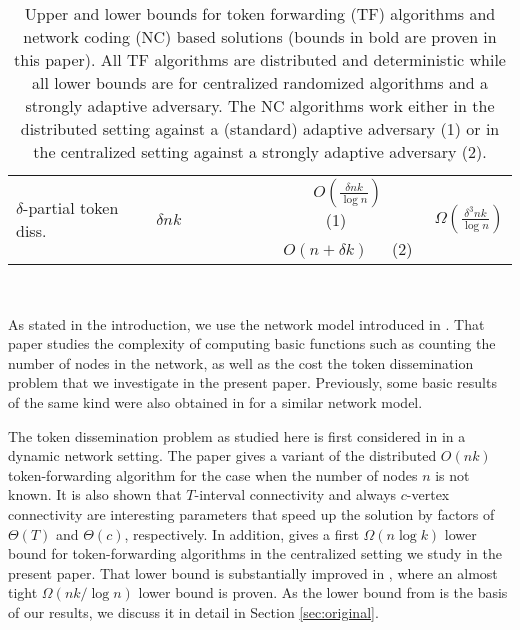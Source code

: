 \documentclass{llncs}
\begin{document}
\begin{table}[t]
\begin{tabular}{ | l || c | c | c | }
\multirow{2}{*}{$\delta$-partial token diss.} & \multirow{2}{*}{$\delta nk$} 	&\ \ \ \ \ \ \ \ \ \ 	 $O(\frac{\delta nk}{\log n})$ \ \ \ \ \ \ \ \small (1)  &  \multirow{2}{*}{ {\boldmath$\Omega(\frac{\delta^3 nk}{\log n})$} }\\ 
 & & \ \ \ \ \ \ \ \ \ \ $O(n+\delta k)$ \ \,\ \small (2) & \\ \hline
\end{tabular}\\[1mm]
\caption{Upper and lower bounds for token forwarding (TF) algorithms
    and network coding (NC) based solutions (bounds in bold are proven
    in this paper). All TF algorithms are
    distributed and deterministic while all lower bounds are for
    centralized randomized algorithms and a strongly adaptive
    adversary. The NC algorithms work either in the distributed
    setting against a (standard) adaptive adversary (1) or in the
    centralized setting against a strongly adaptive adversary (2).} 
\label{table:bounds}
\end{table}

As stated in the introduction, we use the network model introduced in
\cite{KLO}. That paper studies the complexity of computing basic
functions such as counting the number of nodes in the network, as well
as the cost the token dissemination problem that we investigate in the
present paper. Previously, some basic results of the same kind were
also obtained in \cite{odell05} for a similar network model. 

The token dissemination problem as studied here is first considered in
\cite{KLO} in a dynamic network setting. The paper gives a variant of
the distributed $O(nk)$ token-forwarding algorithm for the case when
the number of nodes $n$ is not known. It is also shown that
$T$-interval connectivity and always $c$-vertex connectivity are
interesting parameters that speed up the solution by factors
of $\Theta(T)$ and $\Theta(c)$, respectively. In addition, \cite{KLO}
gives a first $\Omega(n\log k)$ lower bound for token-forwarding
algorithms in the centralized setting we study in the present
paper. That lower bound is substantially improved in \cite{LBarxiv},
where an almost tight $\Omega(nk/\log n)$ lower bound is proven. As
the lower bound from \cite{LBarxiv} is the basis of our results, we
discuss it in detail in Section \ref{sec:original}.
\end{document}

